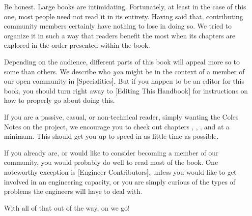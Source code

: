 

Be honest. Large books are intimidating. Fortunately, at least in the case of this one, most people need not read it in its entirety. Having said that, contributing community members certainly have nothing to lose in doing so. We tried to organize it in such a way that readers benefit the most when its chapters are explored in the order presented within the book.

Depending on the audience, different parts of this book will appeal more so to some than others. We describe who {\it you} might be in the context of a member of our open community in [Specialities]. But if you happen to be an editor for this book, you should turn right away to [Editing This Handbook] for instructions on how to properly go about doing this.

If you are a passive, casual, or non-technical reader, simply wanting the Coles Notes on the project, we encourage you to check out chapters \in[Leitmotifs], , , and \in[Timeline] at a minimum. This should get you up to speed in as little time as possible.

If you already are, or would like to consider becoming a member of our community, you would probably do well to read most of the book. One noteworthy exception is [Engineer Contributors], unless you would like to get involved in an engineering capacity, or you are simply curious of the types of problems the engineers will have to deal with.

With all of that out of the way, on we go!

\StopChapter

